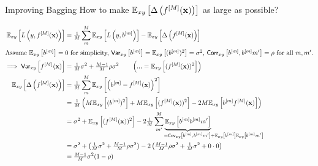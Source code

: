\documentclass[11pt,compress,t,notes=noshow, xcolor=table]{beamer}
\begin{document}
\begin{vbframe}{Improving Bagging}
How to make $\mathbb{E}_{xy}\left[\Delta\left(f^{[M]}(\mathbf{x})\right)\right]$ as large as possible?
\begin{scriptsize}
\begin{align*}
\Exy\left[L\left(y, \fM \right)\right] &= \tfrac{1}{M}\sum^M_{m} \Exy\left[L\left(y, \bl \right)\right] - \Exy\left[\ambifM\right] \\
\shortintertext{Assume $\Exy\left[\bl\right] = 0$ for simplicity, $\var_{xy}\left[\bl\right] = \Exy\left[(\bl)^2\right] = \sigma^2$, $\corr_{xy}\left[\bl, \bl{m'}\right] = \rho$ for all $m, m'$.}
\implies 
\var_{xy}\left[\fM\right] &= \tfrac{1}{M} \sigma^2 +  \tfrac{M-1}{M} \rho \sigma^2 \qquad\left(... = \Exy\left[(\fM)^2\right]\right)\\
 \Exy\left[\ambifM\right] &= \tfrac{1}{M}\sum^M_{m} \Exy\left[\left(\bl- \fM\right)^2\right]\\
 & = \tfrac{1}{M}\left(M \Exy\left[(\bl)^2\right] + M \Exy\left[(\fM)^2\right] - 
     2 M \Exy\left[\bl\fM\right]\right) \\
  & = \sigma^2  + \Exy\left[(\fM)^2\right] - 2 \tfrac{1}{M}\sum^M_{m'} \underbrace{\Exy\left[\bl \bl{m'} \right]}_{\mathclap{\qquad\qquad\qquad\qquad= \cov_{xy}\left[\bl, \bl{m'} \right] + \Exy\left[\bl\right]\Exy\left[\bl{m'}\right]}} \\
  &=  \sigma^2  + \left(\tfrac{1}{M} \sigma^2 +   \tfrac{M-1}{M} \rho \sigma^2\right) - 2\left(\tfrac{M-1}{M} \rho\sigma^2 + \tfrac{1}{M}\sigma^2 + 0 \cdot 0 \right)\\
  &= \tfrac{M-1}{M} \sigma^2 (1-\rho)
\end{align*}
\end{scriptsize}


\end{vbframe}
\end{document}
